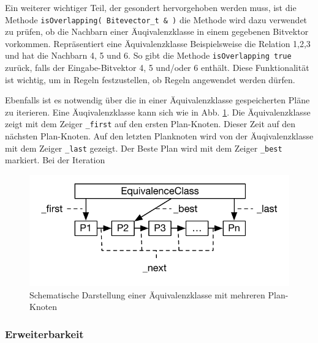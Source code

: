 Ein weiterer wichtiger Teil, der gesondert hervorgehoben werden muss, ist die Methode \texttt{isOverlapping( Bitevector\_t \& )} die Methode wird dazu verwendet zu prüfen, ob die Nachbarn einer Äuqivalenzklasse in einem gegebenen Bitvektor vorkommen. Repräsentiert eine Äquivalenzklasse Beispielsweise die Relation 1,2,3 und hat die Nachbarn 4, 5 und 6. So gibt die Methode \texttt{isOverlapping true} zurück, falls der Eingabe-Bitvektor 4, 5 und/oder 6 enthält. Diese Funktionalität ist wichtig, um in Regeln festzustellen, ob Regeln angewendet werden dürfen.

Ebenfalls ist es notwendig über die in einer Äquivalenzklasse gespeicherten Pläne zu iterieren. Eine Äuqivalenzklasse kann sich wie in Abb. \ref{EquivalenceClassList}. Die Äquivalenzklasse zeigt mit dem Zeiger \texttt{\_first} auf den ersten Plan-Knoten. Dieser Zeit auf den nächsten Plan-Knoten. Auf den letzten Planknoten wird von der Äuqivalenzklasse mit dem Zeiger \texttt{\_last} gezeigt. Der Beste Plan wird mit dem Zeiger \texttt{\_best} markiert. Bei der Iteration

\begin{figure}[ht]
  \centering
  \includegraphics{04_Implementierung/EquivalenceClassList.pdf}
  \caption{Schematische Darstellung einer Äquivalenzklasse mit mehreren Plan-Knoten}
  \label{EquivalenceClassList}
\end{figure}



\subsubsection{Erweiterbarkeit}

